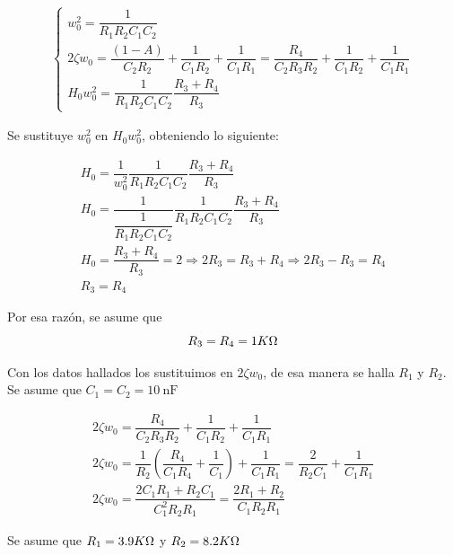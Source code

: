 \begin{enumerate}
\begin{itemize}
                    \begin{gather*}
                        \begin{cases}
                            w_0^2=\dfrac{1}{R_1R_2C_1C_2}\\[0.5cm]
                            2\zeta w_0=\dfrac{(1-A)}{C_2R_2}+\dfrac{1}{C_1R_2}+\dfrac{1}{C_1R_1}=\dfrac{R_4}{C_2R_3R_2}+\dfrac{1}{C_1R_2}+\dfrac{1}{C_1R_1}\\[0.5cm]
                            H_0w_0^2=\dfrac{1}{R_1R_2C_1C_2}\dfrac{R_3+R_4}{R_3}
                        \end{cases}
                    \end{gather*}
        
                    Se sustituye $w_0^2$ en $H_0w_0^2$, obteniendo lo siguiente:
        
                    \begin{gather*}
                        H_0=\dfrac{1}{w_0^2}\dfrac{1}{R_1R_2C_1C_2}\dfrac{R_3+R_4}{R_3}\\[0.5cm]
                        H_0=\dfrac{1}{\dfrac{1}{R_1R_2C_1C_2}}\dfrac{1}{R_1R_2C_1C_2}\dfrac{R_3+R_4}{R_3}\\[0.5cm]
                        H_0=\dfrac{R_3+R_4}{R_3}=2 \Longrightarrow 2R_3=R_3+R_4 \Longrightarrow 2R_3-R_3=R_4\\[0.5cm]
                        R_3=R_4
                    \end{gather*}
        
                    Por esa razón, se asume que $$R_3=R_4=1K\ohm$$
        
                    Con los datos hallados los sustituimos en $2\zeta w_0$, de esa manera se halla $R_1$ y $R_2$. Se asume que $C_1=C_2=\SI{10}{\nano\farad}$

                    \begin{gather*}
                        2\zeta w_0= \dfrac{R_4}{C_2R_3R_2}+\dfrac{1}{C_1R_2}+\dfrac{1}{C_1R_1}\\[0.5cm]
                        2\zeta w_0=\dfrac{1}{R_2}\left(\dfrac{R_4}{C_1R_4}+\dfrac{1}{C_1}\right)+\dfrac{1}{C_1R_1}=\dfrac{2}{R_2C_1}+\dfrac{1}{C_1R_1}\\[0.5cm]
                        2\zeta w_0=\dfrac{2C_1R_1+R_2C_1}{C_1^2R_2R_1}=\dfrac{2R_1+R_2}{C_1R_2R_1}
                    \end{gather*}

                    Se asume que $R_1=3.9K\ohm$ y $R_2=8.2K\ohm$


\end{itemize}
\end{enumerate}
